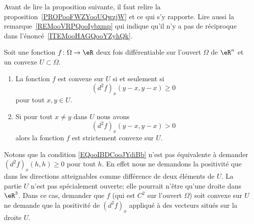 Avant de lire la proposition suivante, il faut relire la proposition~\ref{PROPooFWZYooUQwzjW} et ce qui s'y rapporte.
Lire aussi la remarque~\ref{REMooVRPQooIybxmp} qui indique
qu'il n'y a pas de réciproque dans l'énoncé~\ref{ITEMooHAGQooYZyhQk}.
\begin{proposition}      \label{PROPooBMIRooFkQSAb}
    Soit une fonction \( f\colon \Omega\to \eR\) deux fois différentiable sur l'ouvert \( \Omega\) de \( \eR^n\) et un convexe \( U\subset \Omega\).
    \begin{enumerate}
        \item       \label{ITEMooZQCAooIFjHOn}
            La fonction \( f\) est convexe sur \( U\) si et seulement si
            \begin{equation}        \label{EQooIBDCooJYdiBb}
                (d^2f)_x(y-x,y-x)\geq 0
            \end{equation}
            pour tout \( x,y\in U\).
        \item       \label{ITEMooHAGQooYZyhQk}
            Si pour tout \( x\neq y\) dans \( U\) nous avons
            \begin{equation}
                (d^2f)_x(y-x,y-x)>0
            \end{equation}
            alors la fonction \( f\) est strictement convexe sur \( U\).
    \end{enumerate}
\end{proposition}

\begin{remark}      \label{REMooYCRKooEQNIkC}
    Notons que la condition \eqref{EQooIBDCooJYdiBb} n'est pas équivalente à demander \( (d^2f)_x(h,h)\geq 0\) pour tout \( h\). En effet nous ne demandons la positivité que dans les directions atteignables comme différence de deux éléments de \( U\). La partie \( U\) n'est pas spécialement ouverte; elle pourrait n'être qu'une droite dans \( \eR^3\). Dans ce cas, demander que \( f\) (qui est \( C^2\) sur l'ouvert \( \Omega\)) soit convexe sur \( U\) ne demande que la positivité de \( (d^2f)_x\) appliqué à des vecteurs situés sur la droite \( U\).
\end{remark}

